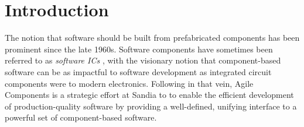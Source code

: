 \documentclass[pdf,ps2pdf,12pt,report]{SANDreport}
\theoremstyle{plain}
\theoremstyle{definition}
\theoremstyle{remark}
\numberwithin{equation}{section}
\begin{document}


    \SANDmain		%

\section{Introduction}

The notion that software should be built from prefabricated components has been prominent since the late 1960s. Software components have sometimes been referred to as \emph{software ICs} \cite{Cox:OOP:1991}, with the visionary notion that component-based software can be as impactful to software development as integrated circuit components were to modern electronics. Following in that vein, Agile Components is a strategic effort at Sandia to to enable the efficient development of production-quality software by providing a well-defined, unifying interface to a powerful set of component-based software.
\end{document}
